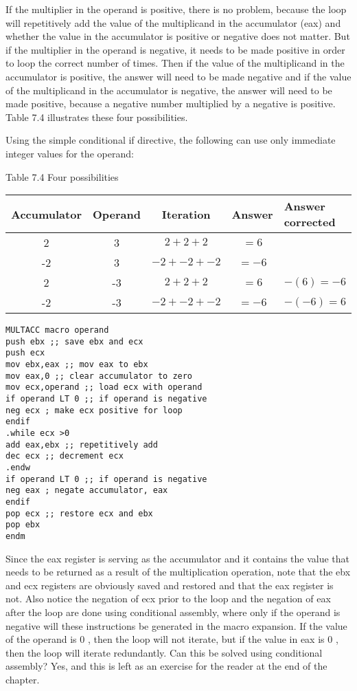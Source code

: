 \documentclass[10pt]{article}
\begin{document}
If the multiplier in the operand is positive, there is no problem, because the loop will repetitively add the value of the multiplicand in the accumulator (eax) and whether the value in the accumulator is positive or negative does not matter. But if the multiplier in the operand is negative, it needs to be made positive in order to loop the correct number of times. Then if the value of the multiplicand in the accumulator is positive, the answer will need to be made negative and if the value of the multiplicand in the accumulator is negative, the answer will need to be made positive, because a negative number multiplied by a negative is positive. Table 7.4 illustrates these four possibilities.

Using the simple conditional if directive, the following can use only immediate integer values for the operand:

Table 7.4 Four possibilities

\begin{center}
\begin{tabular}{|ccccl|}
\hline
Accumulator & Operand & Iteration & Answer & Answer corrected \\
\hline
2 & 3 & $2+2+2$ & $=6$ &  \\
\hline
-2 & 3 & $-2+-2+-2$ & $=-6$ &  \\
2 & -3 & $2+2+2$ & $=6$ & $-(6)=-6$ \\
-2 & -3 & $-2+-2+-2$ & $=-6$ & $-(-6)=6$ \\
\hline
\end{tabular}
\end{center}

\begin{verbatim}
MULTACC macro operand
push ebx ;; save ebx and ecx
push ecx
mov ebx,eax ;; mov eax to ebx
mov eax,0 ;; clear accumulator to zero
mov ecx,operand ;; load ecx with operand
if operand LT 0 ;; if operand is negative
neg ecx ; make ecx positive for loop
endif
.while ecx >0
add eax,ebx ;; repetitively add
dec ecx ;; decrement ecx
.endw
if operand LT 0 ;; if operand is negative
neg eax ; negate accumulator, eax
endif
pop ecx ;; restore ecx and ebx
pop ebx
endm
\end{verbatim}

Since the eax register is serving as the accumulator and it contains the value that needs to be returned as a result of the multiplication operation, note that the ebx and ecx registers are obviously saved and restored and that the eax register is not. Also notice the negation of ecx prior to the loop and the negation of eax after the loop are done using conditional assembly, where only if the operand is negative will these instructions be generated in the macro expansion. If the value of the operand is 0 , then the loop will not iterate, but if the value in eax is 0 , then the loop will iterate redundantly. Can this be solved using conditional assembly? Yes, and this is left as an exercise for the reader at the end of the chapter.
\end{document}
